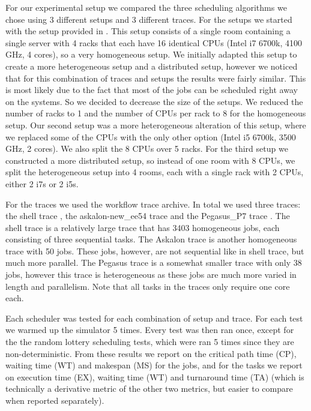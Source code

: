 \documentclass{article}
\begin{document}
For our experimental setup we compared the three scheduling algorithms we chose using 3 different setups and 3 different traces. For the setups we started with the setup provided in \cite{andreadis2018reference}. This setup consists of a single room containing a single server with 4 racks that each have 16 identical CPUs (Intel i7 6700k, 4100 GHz, 4 cores), so a very homogeneous setup. We initially adapted this setup to create a more heterogeneous setup and a distributed setup, however we noticed that for this combination of traces and setups the results were fairly similar. This is most likely due to the fact that most of the jobs can be scheduled right away on the systems. So we decided to decrease the size of the setups. We reduced the number of racks to 1 and the number of CPUs per rack to 8 for the homogeneous setup. Our second setup was a more heterogeneous alteration of this setup, where we replaced some of the CPUs with the only other option (Intel i5 6700k, 3500 GHz, 2 cores). We also split the 8 CPUs over 5 racks. For the third setup we constructed a more distributed setup, so instead of one room with 8 CPUs, we split the heterogeneous setup into 4 rooms, each with a single rack with 2 CPUs, either 2 i7s or 2 i5s.

For the traces we used the workflow trace archive. In total we used three traces: the shell trace \cite{shell}, the askalon-new\_ee54 trace \cite{askalon} and the Pegasus\_P7 trace \cite{pegasus}. The shell trace is a relatively large trace that has 3403 homogeneous jobs, each consisting of three sequential tasks. The Askalon trace is another homogeneous trace with 50 jobs. These jobs, however, are not sequential like in shell trace, but much more parallel. The Pegasus trace is a somewhat smaller trace with only 38 jobs, however this trace is heterogeneous as these jobs are much more varied in length and parallelism. Note that all tasks in the traces only require one core each.

Each scheduler was tested for each combination of setup and trace. For each test we warmed up the simulator 5 times. Every test was then ran once, except for the the random lottery scheduling tests, which were ran 5 times since they are non-deterministic. From these results we report on the critical path time (CP), waiting time (WT) and makespan (MS) for the jobs, and for the tasks we report on execution time (EX), waiting time (WT) and turnaround time (TA) (which is technically a derivative metric of the other two metrics, but easier to compare when reported separately).
\end{document}
